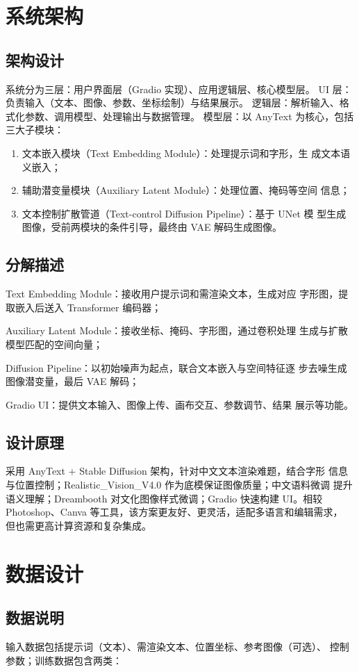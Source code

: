 \documentclass[a4paper,12pt]{article}
\begin{document}
\section{系统架构}
\subsection{架构设计}
系统分为三层：用户界面层（Gradio 实现）、应用逻辑层、核心模型层。
UI 层：负责输入（文本、图像、参数、坐标绘制）与结果展示。
逻辑层：解析输入、格式化参数、调用模型、处理输出与数据管理。
模型层：以 AnyText 为核心，包括三大子模块：
\begin{enumerate}
    \item 文本嵌入模块（Text Embedding Module）：处理提示词和字形，生
    成文本语义嵌入；
    \item 辅助潜变量模块（Auxiliary Latent Module）：处理位置、掩码等空间
    信息；
    \item 文本控制扩散管道（Text-control Diffusion Pipeline）：基于 UNet 模
    型生成图像，受前两模块的条件引导，最终由 VAE 解码生成图像。
\end{enumerate}
\subsection{分解描述}
Text Embedding Module：接收用户提示词和需渲染文本，生成对应
字形图，提取嵌入后送入 Transformer 编码器；

Auxiliary Latent Module：接收坐标、掩码、字形图，通过卷积处理
生成与扩散模型匹配的空间向量；

Diffusion Pipeline：以初始噪声为起点，联合文本嵌入与空间特征逐
步去噪生成图像潜变量，最后 VAE 解码；

Gradio UI：提供文本输入、图像上传、画布交互、参数调节、结果
展示等功能。
\subsection{设计原理}
采用 AnyText + Stable Diffusion 架构，针对中文文本渲染难题，结合字形
信息与位置控制；Realistic\_Vision\_V4.0 作为底模保证图像质量；中文语料微调
提升语义理解；Dreambooth 对文化图像样式微调；Gradio 快速构建 UI。相较
Photoshop、Canva 等工具，该方案更友好、更灵活，适配多语言和编辑需求，
但也需更高计算资源和复杂集成。

\section{数据设计}
\subsection{数据说明}
输入数据包括提示词（文本）、需渲染文本、位置坐标、参考图像（可选）、
控制参数；训练数据包含两类：
\end{document}
